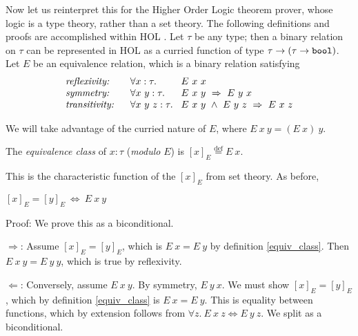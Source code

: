\documentclass[envcountsame,runningheads]{llncs}
\def\defeq{\stackrel{\mathrm{def}}{=}}
\begin{document}
Now let us reinterpret this for the Higher Order Logic theorem prover,
whose logic is a type
theory, rather than a set theory.
The following definitions and proofs are accomplished within 
HOL \cite{GoMe93}.
Let $\tau$ be any type; then a binary relation on $\tau$ can be
represented in HOL
as a curried function
of type $\tau \rightarrow (\tau \rightarrow \mbox{\tt bool})$.
Let $E$ be an equivalence relation, which is a binary relation satisfying
$$
\begin{array}{l@{\hspace{0.6cm}}l@{\hspace{0.3cm}}l}
\mbox{\it reflexivity:} &
\forall x:\tau . & E\ x\ x \\
\mbox{\it symmetry:} &
\forall x\ y :\tau. & E\ x\ y \ \Rightarrow \ E\ y\ x \\
\mbox{\it transitivity:} &
\forall x\ y\ z:\tau. & E\ x\ y \ \wedge \ E\ y\ z \ \Rightarrow \ E\ x\ z
\end{array}
$$

We will take advantage of the curried nature of $E$, where 
$E\ x\ y = (E\ x)\ y$.
%
%
\begin{definition}
\label{equiv_class}
The {\it equivalence class\/} of $x:\tau$ ({\it modulo} $E$) is
$[ x ]_E \defeq  E \ x.$ 
\end{definition}
This is the characteristic function 
of the $[ x ]_E$ from set theory.
As before,

\begin{lemma}
\label{ty_REL_equiv}
$
[ x ]_E = [ y ]_E \ \Leftrightarrow \ E\ x\ y$
\end{lemma}
Proof:
We prove this as a biconditional.

$\Rightarrow$:
Assume $[ x ]_E = [ y ]_E$, which is $E\ x = E\ y$ by 
definition \ref{equiv_class}.
Then $E\ x\ y =
E\ y\ y$,
which is true by reflexivity.

$\Leftarrow$:
Conversely,
assume $E\ x\ y$.
By symmetry, $E\ y\ x$.
We must show
$[ x ]_E = [ y ]_E$,
which by definition \ref{equiv_class}
is $E\ x = E\ y$.
This is equality between functions, which by extension follows from
$\forall z.\ E\ x\ z \Leftrightarrow E\ y\ z$.
We split as a biconditional.
\end{document}
